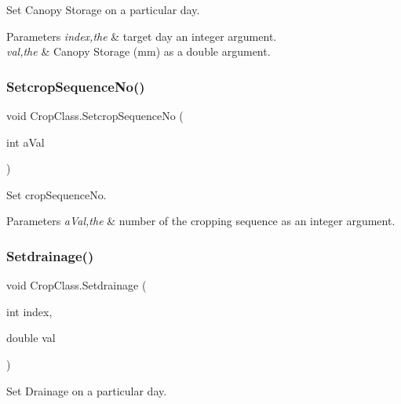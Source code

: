 Set Canopy Storage on a particular day. 


\begin{DoxyParams}{Parameters}
{\em index,the} & target day an integer argument. \\
\hline
{\em val,the} & Canopy Storage (mm) as a double argument. \\
\hline
\end{DoxyParams}
\mbox{\label{class_crop_class_aa9fd67d026734124a666d33b3f7268c4}} 
\subsubsection{\texorpdfstring{SetcropSequenceNo()}{SetcropSequenceNo()}}
{\footnotesize\ttfamily void Crop\+Class.\+Setcrop\+Sequence\+No (\begin{DoxyParamCaption}\item[{int}]{a\+Val }\end{DoxyParamCaption})\hspace{0.3cm}{\ttfamily [inline]}}



Set crop\+Sequence\+No. 


\begin{DoxyParams}{Parameters}
{\em a\+Val,the} & number of the cropping sequence as an integer argument. \\
\hline
\end{DoxyParams}
\mbox{\label{class_crop_class_a1d24f0afc61cad2c1f462a0cafccfe64}} 
\subsubsection{\texorpdfstring{Setdrainage()}{Setdrainage()}}
{\footnotesize\ttfamily void Crop\+Class.\+Setdrainage (\begin{DoxyParamCaption}\item[{int}]{index,  }\item[{double}]{val }\end{DoxyParamCaption})\hspace{0.3cm}{\ttfamily [inline]}}



Set Drainage on a particular day. 


